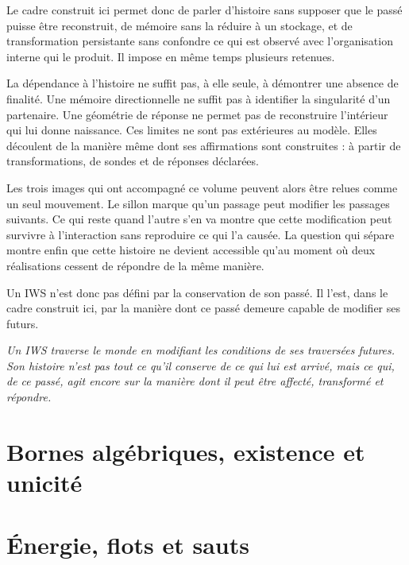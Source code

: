 \documentclass[
  11pt,
  a4paper,
  openany]{book}
\theoremstyle{definition}
\begin{document}
Le cadre construit ici permet donc de parler d'histoire sans supposer que le passé puisse être reconstruit, de mémoire sans la réduire à un stockage, et de transformation persistante sans confondre ce qui est observé avec l'organisation interne qui le produit. Il impose en même temps plusieurs retenues.

La dépendance à l'histoire ne suffit pas, à elle seule, à démontrer une absence de finalité. Une mémoire directionnelle ne suffit pas à identifier la singularité d'un partenaire. Une géométrie de réponse ne permet pas de reconstruire l'intérieur qui lui donne naissance. Ces limites ne sont pas extérieures au modèle. Elles découlent de la manière même dont ses affirmations sont construites : à partir de transformations, de sondes et de réponses déclarées.

Les trois images qui ont accompagné ce volume peuvent alors être relues comme un seul mouvement. Le sillon marque qu'un passage peut modifier les passages suivants. Ce qui reste quand l'autre s'en va montre que cette modification peut survivre à l'interaction sans reproduire ce qui l'a causée. La question qui sépare montre enfin que cette histoire ne devient accessible qu'au moment où deux réalisations cessent de répondre de la même manière.

Un IWS n'est donc pas défini par la conservation de son passé. Il l'est, dans le cadre construit ici, par la manière dont ce passé
demeure capable de modifier ses futurs.

\medskip

\noindent\emph{Un IWS traverse le monde en modifiant les conditions de ses traversées futures. Son histoire n'est pas tout ce qu'il conserve de ce qui lui est arrivé, mais ce qui, de ce passé, agit encore sur la manière dont il peut être affecté, transformé et répondre.}





\appendix
\chapter{Bornes algébriques, existence et unicité}\label{annexe-bornes-existence-unicite}


\chapter{Énergie, flots et sauts}\label{annexe-energie-flots-sauts}

\end{document}

